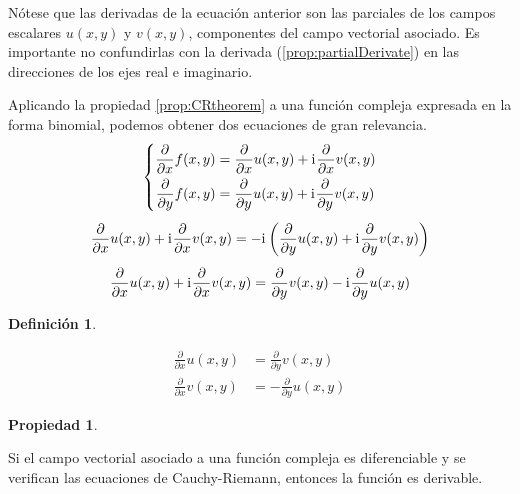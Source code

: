 \documentclass[a5paper,12pt,twoside]{book}
\newtheorem{defn}{{Definición}}[chapter]
\newtheorem{prop}{{Propiedad}}[chapter]
\begin{document}
Nótese que las derivadas de la ecuación anterior son las parciales de los campos escalares $u(x,y)$ y $v(x,y)$, componentes del campo vectorial asociado. Es importante no confundirlas con la derivada (\ref{prop:partialDerivate}) en las direcciones de los ejes real e imaginario.

Aplicando la propiedad \ref{prop:CRtheorem} a una función compleja expresada en la forma binomial, podemos obtener dos ecuaciones de gran relevancia.
\begin{gather*}
    \left\{
    \begin{aligned}
        \frac{\partial}{\partial x} f(x,y) &= \frac{\partial}{\partial x} u(x,y) + \mathrm{i}\mkern1mu \frac{\partial}{\partial x} v(x,y)
        \\
        \frac{\partial}{\partial y} f(x,y) &= \frac{\partial}{\partial y} u(x,y) + \mathrm{i}\mkern1mu \frac{\partial}{\partial y} v(x,y)
    \end{aligned}
    \right.
    \\[1ex]
    \frac{\partial}{\partial x} u(x,y) + \mathrm{i}\mkern1mu \frac{\partial}{\partial x} v(x,y) = - \mathrm{i}\mkern1mu \left( \frac{\partial}{\partial y} u(x,y) + \mathrm{i}\mkern1mu \frac{\partial}{\partial y} v(x,y) \right)
    \\[1ex]
    \frac{\partial}{\partial x} u(x,y) + \mathrm{i}\mkern1mu \frac{\partial}{\partial x} v(x,y) = \frac{\partial}{\partial y} v(x,y) - \mathrm{i}\mkern1mu \frac{\partial}{\partial y} u(x,y)
\end{gather*}

\begin{mdframed}[style=MyFrame1]
    \begin{defn}
        \label{defn:CRequations}
    \end{defn}
    \begin{align*}
        \frac{\partial}{\partial x} u(x,y) &= \frac{\partial}{\partial y} v(x,y)
        \\[1em]
        \frac{\partial}{\partial x} v(x,y) &= - \frac{\partial}{\partial y} u(x,y)
    \end{align*}
\end{mdframed}

\begin{mdframed}[style=MyFrame1]
    \begin{prop}
    \end{prop}
    Si el campo vectorial asociado a una función compleja es diferenciable y se verifican las ecuaciones de Cauchy-Riemann, entonces la función es derivable.
\end{mdframed}
\end{document}
